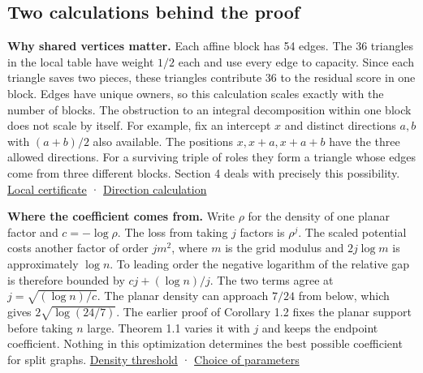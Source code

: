 \documentclass[english,11pt,a4paper]{article}
\begin{document}
\subsection{Two calculations behind the proof}\label{two-calculations-behind-the-proof}

\textbf{Why shared vertices matter.} Each affine block has 54 edges. The 36 triangles in the local table have weight \(1/2\) each and use every edge to capacity. Since each triangle saves two pieces, these triangles contribute 36 to the residual score in one block. Edges have unique owners, so this calculation scales exactly with the number of blocks. The obstruction to an integral decomposition within one block does not scale by itself. For example, fix an intercept \(x\) and distinct directions \(a,b\) with \((a+b)/2\) also available. The positions \(x,x+a,x+a+b\) have the three allowed directions. For a surviving triple of roles they form a triangle whose edges come from three different blocks. Section 4 deals with precisely this possibility. \href{https://github.com/jtraverso/split-clique-partition-gap/blob/ccb5444b2ecdff9de1d6221133633a25a224953d/R434/LocalH54.lean}{Local certificate} · \href{https://github.com/jtraverso/split-clique-partition-gap/blob/ccb5444b2ecdff9de1d6221133633a25a224953d/R434/CoreDirections.lean}{Direction calculation}

\textbf{Where the coefficient comes from.} Write \(\rho\) for the density of one planar factor and \(c=-\log\rho\). The loss from taking \(j\) factors is \(\rho^j\). The scaled potential costs another factor of order \(jm^2\), where \(m\) is the grid modulus and \(2j\log m\) is approximately \(\log n\). To leading order the negative logarithm of the relative gap is therefore bounded by \(cj+(\log n)/j\). The two terms agree at \(j=\sqrt{(\log n)/c}\). The planar density can approach \(7/24\) from below, which gives \(2\sqrt{\log(24/7)}\). The earlier proof of Corollary 1.2 fixes the planar support before taking \(n\) large. Theorem 1.1 varies it with \(j\) and keeps the endpoint coefficient. Nothing in this optimization determines the best possible coefficient for split graphs. \href{https://github.com/jtraverso/split-clique-partition-gap/blob/ccb5444b2ecdff9de1d6221133633a25a224953d/R434/DensityThreshold.lean}{Density threshold} · \href{https://github.com/jtraverso/split-clique-partition-gap/blob/ccb5444b2ecdff9de1d6221133633a25a224953d/R434/UniformOrder.lean}{Choice of parameters}
\end{document}
